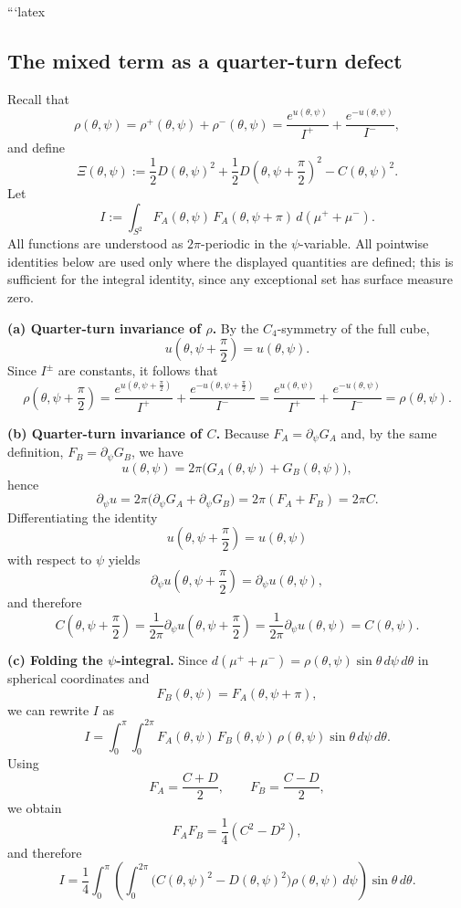 ```latex
\subsection{The mixed term as a quarter-turn defect}

Recall that
\[
\rho(\theta,\psi)=\rho^+(\theta,\psi)+\rho^-(\theta,\psi)
=
\frac{e^{u(\theta,\psi)}}{I^+}
+
\frac{e^{-u(\theta,\psi)}}{I^-},
\]
and define
\[
\Xi(\theta,\psi)
:=
\frac{1}{2}D(\theta,\psi)^2
+
\frac{1}{2}D\!\left(\theta,\psi+\frac{\pi}{2}\right)^2
-
C(\theta,\psi)^2.
\]
Let
\[
I:=\int_{S^2} F_A(\theta,\psi)\,F_A(\theta,\psi+\pi)\,d(\mu^++\mu^-).
\]
All functions are understood as \(2\pi\)-periodic in the \(\psi\)-variable. 
All pointwise identities below are used only where the displayed quantities are defined; this is sufficient for the integral identity, since any exceptional set has surface measure zero.

\medskip
\noindent\textbf{(a) Quarter-turn invariance of \(\rho\).}
By the \(C_4\)-symmetry of the full cube,
\[
u\!\left(\theta,\psi+\frac{\pi}{2}\right)=u(\theta,\psi).
\]
Since \(I^\pm\) are constants, it follows that
\[
\rho\!\left(\theta,\psi+\frac{\pi}{2}\right)
=
\frac{e^{u(\theta,\psi+\frac{\pi}{2})}}{I^+}
+
\frac{e^{-u(\theta,\psi+\frac{\pi}{2})}}{I^-}
=
\frac{e^{u(\theta,\psi)}}{I^+}
+
\frac{e^{-u(\theta,\psi)}}{I^-}
=
\rho(\theta,\psi).
\]

\medskip
\noindent\textbf{(b) Quarter-turn invariance of \(C\).}
Because \(F_A=\partial_\psi G_A\) and, by the same definition, \(F_B=\partial_\psi G_B\), we have
\[
u(\theta,\psi)=2\pi\bigl(G_A(\theta,\psi)+G_B(\theta,\psi)\bigr),
\]
hence
\[
\partial_\psi u
=
2\pi\bigl(\partial_\psi G_A+\partial_\psi G_B\bigr)
=
2\pi(F_A+F_B)
=
2\pi C.
\]
Differentiating the identity
\[
u\!\left(\theta,\psi+\frac{\pi}{2}\right)=u(\theta,\psi)
\]
with respect to \(\psi\) yields
\[
\partial_\psi u\!\left(\theta,\psi+\frac{\pi}{2}\right)
=
\partial_\psi u(\theta,\psi),
\]
and therefore
\[
C\!\left(\theta,\psi+\frac{\pi}{2}\right)
=
\frac{1}{2\pi}\partial_\psi u\!\left(\theta,\psi+\frac{\pi}{2}\right)
=
\frac{1}{2\pi}\partial_\psi u(\theta,\psi)
=
C(\theta,\psi).
\]

\medskip
\noindent\textbf{(c) Folding the \(\psi\)-integral.}
Since \(d(\mu^++\mu^-)=\rho(\theta,\psi)\sin\theta\,d\psi\,d\theta\) in spherical coordinates and
\[
F_B(\theta,\psi)=F_A(\theta,\psi+\pi),
\]
we can rewrite \(I\) as
\[
I
=
\int_0^\pi\int_0^{2\pi}
F_A(\theta,\psi)\,F_B(\theta,\psi)\,\rho(\theta,\psi)\sin\theta\,d\psi\,d\theta.
\]
Using
\[
F_A=\frac{C+D}{2},
\qquad
F_B=\frac{C-D}{2},
\]
we obtain
\[
F_A F_B=\frac{1}{4}(C^2-D^2),
\]
and therefore
\[
I
=
\frac{1}{4}\int_0^\pi
\left(
\int_0^{2\pi}
\bigl(C(\theta,\psi)^2-D(\theta,\psi)^2\bigr)\rho(\theta,\psi)\,d\psi
\right)
\sin\theta\,d\theta.
\]

